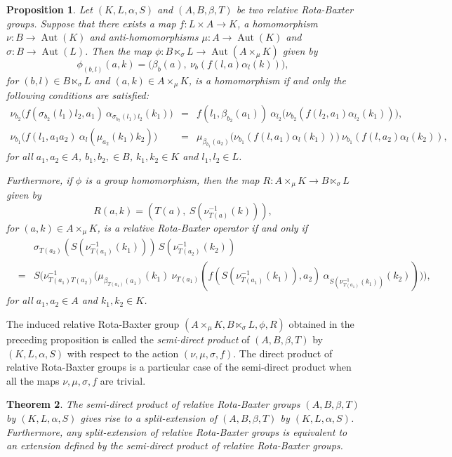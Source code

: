 \documentclass[11pt]{amsart}
\theoremstyle{thrm}
\theoremstyle{plain}
\newtheorem{thm}{Theorem}[section]
\newtheorem{prop}[thm]{Proposition}
\theoremstyle{definition}
\newcommand{\Aut}{\operatorname{Aut} }
\numberwithin{equation}{section}
\begin{document}
\begin{prop}
Let $(K,L, \alpha,S )$  and  $(A,B, \beta, T)$ be two relative Rota-Baxter groups. Suppose that there exists a map $f: L \times A \rightarrow K$,  a homomorphism $\nu: B \rightarrow \Aut(K)$ and anti-homomorphisms $\mu: A \rightarrow \Aut(K)$ and $\sigma :B \rightarrow \Aut(L)$. Then the map $\phi: B \ltimes_{\sigma} L \rightarrow  \Aut(A \times_{\mu} K)$ given by $$ \phi_{(b,l)}(a,k)=\big(\beta_b(a),~ \nu_b(f(l,a)\alpha_l(k))\big),$$ for $(b, l) \in   B \ltimes_{\sigma} L$ and $(a,k) \in  A \times_{\mu} K$, is a homomorphism if and only the following conditions are satisfied:
	\begin{eqnarray}
		\nu_{b_2}\big(f(\sigma_{b_2}(l_1) l_2,a_1)  ~\alpha_{\sigma_{b_2}(l_1) l_2}(k_1)\big)& =& f(l_1, \beta_{b_2}(a_1)) ~\alpha_{l_2}\big(\nu_{b_2}(f(l_2, a_1) \alpha_{l_2}(k_1))\big),\\
		\nu_{b_1}\big(f(l_1, a_1 a_2) ~\alpha_l(\mu_{a_2}(k_1) k_2) \big) &=& \mu_{\beta_{b_1}(a_2)}\big(\nu_{b_1}(f(l,a_1) \alpha_l(k_1))\big) ~\nu_{b_1}(f(l,a_2) \alpha_l(k_2)),
	\end{eqnarray}
for all $a_1, a_2 \in A$, $b_1, b_2, \in B$, $k_1, k_2 \in K$ and $l_1, l_2 \in L$.

Furthermore, if $\phi$ is a group homomorphism, then the map $R: A \times_{\mu} K \rightarrow B \ltimes_{\sigma} L$ given by 
$$R(a, k)=(T(a), ~S(\nu^{-1}_{T(a)}(k))),$$ for $(a,k) \in  A \times_{\mu} K$, is a relative Rota-Baxter operator if and only if 
\begin{eqnarray*}
&& \sigma_{T(a_2)}(S(\nu^{-1}_{T(a_1)}(k_1))) \, S(\nu^{-1}_{T(a_2)}(k_2))\\
 &=& S\big(\nu^{-1}_{T(a_1) T(a_2)}\big(\mu_{\beta_{T(a_1)}(a_1)}(k_1) ~\nu_{T(a_1)}(f(S(\nu^{-1}_{T(a_1)}(k_1)), a_2) ~\alpha_{S(\nu^{-1}_{T(a_1)}(k_1))}(k_2)) \big) \big),
	\end{eqnarray*}
for all $a_1, a_2 \in A$ and $k_1, k_2 \in K$.
\end{prop}


The induced relative Rota-Baxter group $(A \times_{\mu} K, B \ltimes_{\sigma} L , \phi, R)$ obtained in the preceding proposition is called the \emph{semi-direct product} of $(A,B, \beta, T)$ by $(K,L, \alpha,S )$ with respect to the action $(\nu, \mu, \sigma, f)$. The direct product of relative Rota-Baxter groups is a particular case of the semi-direct product when all the maps $\nu, \mu,\sigma, f$ are trivial.

\begin{thm}\label{semi-direct product and split extensions}
The semi-direct product of relative Rota-Baxter groups $(A, B, \beta, T)$ by $(K, L, \alpha, S)$ gives rise to a split-extension of $(A, B, \beta, T)$ by $(K, L, \alpha, S)$. Furthermore, any split-extension of relative Rota-Baxter groups is equivalent to an extension defined by the semi-direct product of relative Rota-Baxter groups.
\end{thm}	
\end{document}
